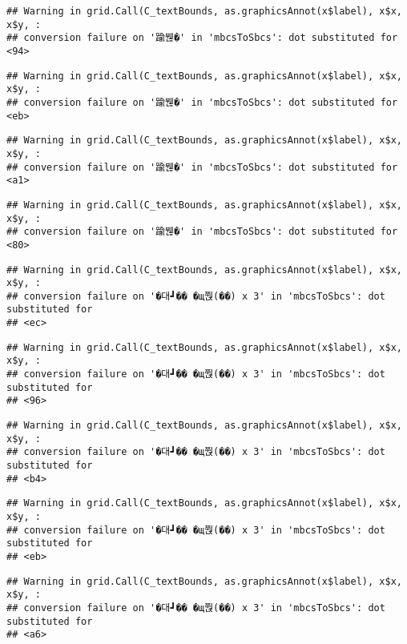 \documentclass[
]{article}
\begin{document}
\begin{verbatim}
## Warning in grid.Call(C_textBounds, as.graphicsAnnot(x$label), x$x, x$y, :
## conversion failure on '踰붾�' in 'mbcsToSbcs': dot substituted for <94>
\end{verbatim}

\begin{verbatim}
## Warning in grid.Call(C_textBounds, as.graphicsAnnot(x$label), x$x, x$y, :
## conversion failure on '踰붾�' in 'mbcsToSbcs': dot substituted for <eb>
\end{verbatim}

\begin{verbatim}
## Warning in grid.Call(C_textBounds, as.graphicsAnnot(x$label), x$x, x$y, :
## conversion failure on '踰붾�' in 'mbcsToSbcs': dot substituted for <a1>
\end{verbatim}

\begin{verbatim}
## Warning in grid.Call(C_textBounds, as.graphicsAnnot(x$label), x$x, x$y, :
## conversion failure on '踰붾�' in 'mbcsToSbcs': dot substituted for <80>
\end{verbatim}

\begin{verbatim}
## Warning in grid.Call(C_textBounds, as.graphicsAnnot(x$label), x$x, x$y, :
## conversion failure on '�대┛�� �щ쭩(��) x 3' in 'mbcsToSbcs': dot substituted for
## <ec>
\end{verbatim}

\begin{verbatim}
## Warning in grid.Call(C_textBounds, as.graphicsAnnot(x$label), x$x, x$y, :
## conversion failure on '�대┛�� �щ쭩(��) x 3' in 'mbcsToSbcs': dot substituted for
## <96>
\end{verbatim}

\begin{verbatim}
## Warning in grid.Call(C_textBounds, as.graphicsAnnot(x$label), x$x, x$y, :
## conversion failure on '�대┛�� �щ쭩(��) x 3' in 'mbcsToSbcs': dot substituted for
## <b4>
\end{verbatim}

\begin{verbatim}
## Warning in grid.Call(C_textBounds, as.graphicsAnnot(x$label), x$x, x$y, :
## conversion failure on '�대┛�� �щ쭩(��) x 3' in 'mbcsToSbcs': dot substituted for
## <eb>
\end{verbatim}

\begin{verbatim}
## Warning in grid.Call(C_textBounds, as.graphicsAnnot(x$label), x$x, x$y, :
## conversion failure on '�대┛�� �щ쭩(��) x 3' in 'mbcsToSbcs': dot substituted for
## <a6>
\end{verbatim}
\end{document}
